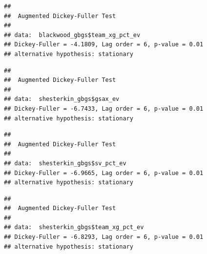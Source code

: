 \documentclass[
  10pt,
]{extarticle}
\newenvironment{Shaded}{\begin{snugshade}}{\end{snugshade}}
\newcommand{\FunctionTok}[1]{\textcolor[rgb]{0.13,0.29,0.53}{\textbf{#1}}}
\newcommand{\NormalTok}[1]{#1}
\newcommand{\SpecialCharTok}[1]{\textcolor[rgb]{0.81,0.36,0.00}{\textbf{#1}}}
\begin{document}
\begin{verbatim}
## 
##  Augmented Dickey-Fuller Test
## 
## data:  blackwood_gbgs$team_xg_pct_ev
## Dickey-Fuller = -4.1809, Lag order = 6, p-value = 0.01
## alternative hypothesis: stationary
\end{verbatim}

\begin{Shaded}
\end{Shaded}

\begin{verbatim}
## 
##  Augmented Dickey-Fuller Test
## 
## data:  shesterkin_gbgs$gsax_ev
## Dickey-Fuller = -6.7433, Lag order = 6, p-value = 0.01
## alternative hypothesis: stationary
\end{verbatim}

\begin{Shaded}
\end{Shaded}

\begin{verbatim}
## 
##  Augmented Dickey-Fuller Test
## 
## data:  shesterkin_gbgs$sv_pct_ev
## Dickey-Fuller = -6.9665, Lag order = 6, p-value = 0.01
## alternative hypothesis: stationary
\end{verbatim}

\begin{Shaded}
\end{Shaded}

\begin{verbatim}
## 
##  Augmented Dickey-Fuller Test
## 
## data:  shesterkin_gbgs$team_xg_pct_ev
## Dickey-Fuller = -6.8293, Lag order = 6, p-value = 0.01
## alternative hypothesis: stationary
\end{verbatim}
\end{document}

